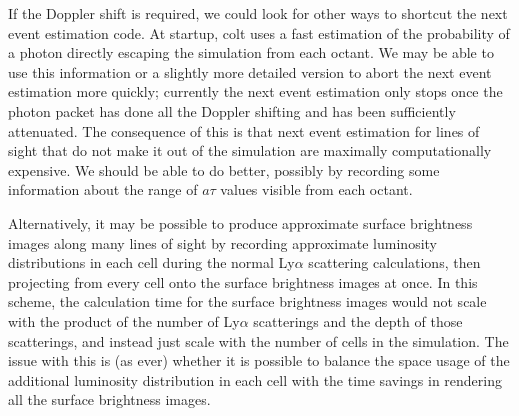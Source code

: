 If the Doppler shift is required, we could look for other ways to shortcut the next event estimation code.
At startup, {\sc colt} uses a fast estimation of the probability of a photon directly escaping the simulation from each octant.
We may be able to use this information or a slightly more detailed version to abort the next event estimation more quickly; currently the next event estimation only stops once the photon packet has done all the Doppler shifting and has been sufficiently attenuated.
The consequence of this is that next event estimation for lines of sight that do not make it out of the simulation are maximally computationally expensive.
We should be able to do better, possibly by recording some information about the range of $a\tau$ values visible from each octant.

Alternatively, it may be possible to produce approximate surface brightness images along many lines of sight by recording approximate luminosity distributions in each cell during the normal Ly$\alpha$ scattering calculations, then projecting from every cell onto the surface brightness images at once.
In this scheme, the calculation time for the surface brightness images would not scale with the product of the number of Ly$\alpha$ scatterings and the depth of those scatterings, and instead just scale with the number of cells in the simulation.
The issue with this is (as ever) whether it is possible to balance the space usage of the additional luminosity distribution in each cell with the time savings in rendering all the surface brightness images.


